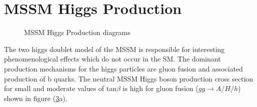 \section{MSSM Higgs Production}

\begin{figure}[t]
\centering
  \begin{subfigure}[b]{.4\textwidth}
\caption[]{}
	\label{fig:ggA}
	\end{subfigure}	
   \begin{subfigure}[b]{.4\textwidth}
	\label{fig:bbA}
	\caption[]{}
    \end{subfigure}	
  	\caption[]
   	{MSSM Higgs Production diagrams}
	\label{fig:MSSMdiagrams}
\end{figure}
The two higgs doublet model of the MSSM is responsible for interesting
phenomenological effects which do not occur in the SM.
The dominant production mechanisms for the higgs particles are gluon
fusion and associated production of b quarks. 
The neutral MSSM Higgs boson production cross section
for small and moderate values of tan$\beta$ is high for 
gluon fusion ($gg\rightarrow A/H/h$) shown in figure (\ref{fig:MSSMdiagrams}a). 

